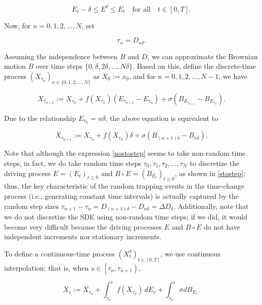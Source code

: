 \documentclass[10pt,reqno,final]{amsart}
\theoremstyle{plain}
\theoremstyle{definition}
\theoremstyle{remark}
\numberwithin{equation}{section}
\numberwithin{figure}{section}
\numberwithin{table}{section}
\begin{document}
\[
E_t - \delta \leq E^\delta \leq E_t \quad \text{for all} \quad t \in [0, T].
\]


Now, for \( n = 0, 1, 2, \ldots, N \), set


\[
\tau_n = D_{n\delta}.
\]



Assuming the independence between \( B \) and \( D \), we can approximate the Brownian motion \( B \) over time steps \(\{0, \delta, 2\delta, \ldots, N\delta\}\). Based on this, define the discrete-time process \(\left(X_{\tau_n}\right)_{n\in\{0,1,2,\ldots, N\}}\) as \( X_0 := x_0 \), and for \( n = 0, 1, 2, \ldots, N-1 \), we have

\begin{equation}\label{stostep}
	X_{\tau_{n+1}} := X_{\tau_n}  + f\left(X_{\tau_n}\right)\left(E_{\tau_{n+1}}-E_{\tau_n}\right)  + \sigma\left(B_{E_{\tau_{n+1}}}-B_{E_{\tau_n}}\right).
\end{equation}

Due to the relationship \( E_{\tau_{n}} = n\delta \), the above equation is equivalent to

\begin{equation}\label{nostostep}
	X_{\tau_{n+1}} :=X_{\tau_n}  + f\left(X_{\tau_n}\right)\delta + \sigma\left(B_{(n+1)\delta}-B_{n\delta}\right).
\end{equation}

Note that although the expression \cref{nostostep} seems to take non-random time steps, in fact, we do take random time steps \(\tau_0, \tau_1, \tau_2, \ldots, \tau_N\) to discretize the driving process \( E = \left(E_t\right)_{t \geq 0} \) and \( B \circ E = \left(B_{E_t}\right)_{t \geq 0} \), as shown in \cref{stostep}; thus, the key characteristic of the random trapping events in the time-change process (i.e., generating constant time intervals) is actually captured by the random step sizes \(\tau_{n+1} - \tau_n = D_{(n+1)\delta} - D_{n\delta} = \Delta D_{\delta}\). Additionally, note that we do not discretize the SDE using non-random time steps; if we did, it would become very difficult because the driving processes \( E \) and \( B \circ E \) do not have independent increments nor stationary increments.

To define a continuous-time process \(\left(X_t^\delta\right)_{t\in[0, T]}\), we use continuous interpolation; that is, when \(s \in \left[\tau_n, \tau_{n+1}\right)\),

\begin{equation}\label{intX}
	X_s:= X_{\tau_n} +  \int_{\tau_n}^s f\left(X_{\tau_n}\right) \, dE_r + \int_{\tau_n}^s \sigma dB_{E_r}.
\end{equation}
\end{document}
